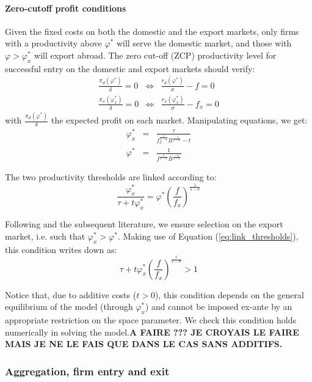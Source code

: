 \documentclass[a4paper,11pt]{article}
\begin{document}
\paragraph{Zero-cutoff profit conditions} Given the fixed costs on both the domestic and the export markets, only firms with a productivity above $\varphi^\ast$ will serve the domestic market, and those with $\varphi>\varphi_x^\ast$ will export abroad. The zero cut-off (ZCP) productivity level for successful entry on the domestic and export markets should verify:
\begin{eqnarray*}
\frac{\pi_d(\varphi^\ast)}{\delta} = 0 &\Leftrightarrow & \frac{r_d(\varphi^\ast)}{\sigma} - f =0\\
\frac{\pi_x(\varphi_x^\ast)}{\delta} = 0 &\Leftrightarrow & \frac{r_x(\varphi_x^\ast)}{\sigma} - f_x = 0
\end{eqnarray*}
\noindent with $\frac{\pi_d(\varphi^\ast)}{\delta}$ the expected profit on each market. Manipulating equations, we get:
\begin{eqnarray*}
  \varphi_x^\ast &=& \frac{\tau}{f_x^{\frac{1}{1-\sigma}}B^{\frac{-1}{1-\sigma}} -t} \\
  \varphi^\ast &=& \frac{1}{f^{\frac{1}{1-\sigma}}B^{\frac{-1}{1-\sigma}}}
\end{eqnarray*}

The two productivity thresholds are linked according to:
\begin{equation}
\frac{\varphi_x^\ast}{\tau+t\varphi_x^\ast} = \varphi^\ast \left( \frac{f}{f_x} \right)^{\frac{1}{1-\sigma}} \label{eq:link_thresholds}
\end{equation}

Following \cite{melitz} and the subsequent literature, we ensure selection on the export market, i.e. such that $\varphi_x^\ast > \varphi^\ast$. Making use of Equation (\ref{eq:link_thresholds}), this condition writes down as:
$$\tau+ t\varphi^\ast_x  \left( \frac{f}{f_x} \right)^{\frac{1}{1-\sigma}} >1$$

Notice that, due to additive costs ($t>0$), this condition depends on the general equilibrium of the model (through $\varphi^\ast_x $) and cannot be imposed ex-ante by an appropriate restriction on the space parameter. We check this condition holds numerically in solving the model.\textbf{A FAIRE ??? JE CROYAIS LE FAIRE MAIS JE NE LE FAIS QUE DANS LE CAS SANS ADDITIFS.}


\subsubsection{Aggregation, firm entry and exit}
\end{document}
